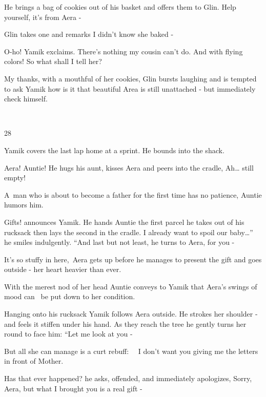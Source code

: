 \documentclass[letterpaper]{article}
\begin{document}
He brings a bag of cookies out of his basket and offers them to Glin. {\textquotedbl}Help yourself, it's from Aera
-{\textquotedbl} 

Glin takes one and remarks {\textquotedbl}I didn't know she baked -{\textquotedbl}

{\textquotedbl}O-ho!{\textquotedbl} Yamik exclaims. {\textquotedbl}There's nothing my cousin can't do. And with flying
colors! So what shall I tell her?{\textquotedbl} 

{\textquotedbl}My thanks, with a mouthful of her cookies,{\textquotedbl} Glin bursts laughing and is tempted to ask
Yamik how is it that beautiful Area is still unattached - but immediately check himself.

~

28~~~~~~~~~~~~~~ 

Yamik covers the last lap home at a sprint. He bounds into the shack. 

{\textquotedbl}Aera! Auntie!{\textquotedbl} He hugs his aunt, kisses Aera and peers into the cradle,
{\textquotedbl}Ah{\dots} still empty!{\textquotedbl} 

{\textquotedbl}A~man who is about to become a father for the first time has no patience,{\textquotedbl} Auntie humors
him. 

{\textquotedbl}Gifts!{\textquotedbl} announces Yamik. He hands Auntie the first parcel he takes out of his rucksack then
lays the second in the cradle. {\textquotedbl}I already want to spoil our baby{\dots}'' he smiles indulgently. ``And
last but not least,{\textquotedbl} he turns to Aera, {\textquotedbl}for you -{\textquotedbl}

{\textquotedbl}It's so stuffy in here,{\textquotedbl}~Aera gets up before he manages to present the gift and goes
outside - her heart heavier than ever.

With the merest nod of her head Auntie conveys to Yamik that Aera's swings of mood can \ be put down to her condition. 

Hanging onto his rucksack Yamik follows Aera outside. He strokes her shoulder - and feels it stiffen under his hand. As
they reach the tree he gently turns her round to face him: ``Let me look at you -{\textquotedbl}

But all she can manage is a curt rebuff: \ \ {\textquotedbl}I don't want you giving me the letters in front of
Mother.{\textquotedbl} 

{\textquotedbl}Has that ever happened?{\textquotedbl} he asks, offended, and immediately apologizes,
{\textquotedbl}Sorry, Aera, but what I brought you is a real gift -{\textquotedbl} 
\end{document}

